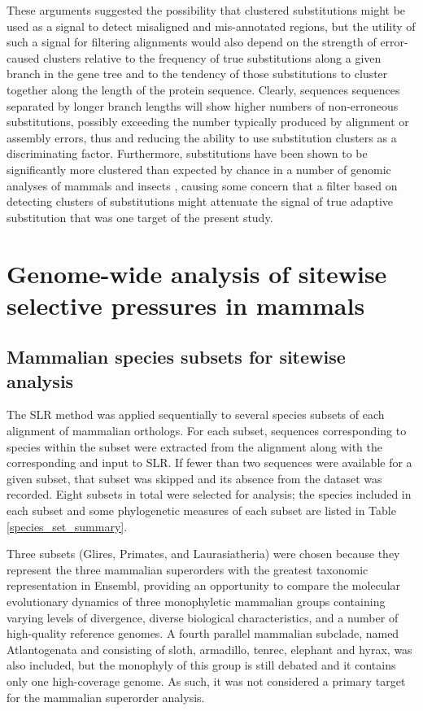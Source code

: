 These arguments suggested the possibility that clustered \nsyn
substitutions might be used as a signal to detect misaligned and
mis-annotated regions, but the utility of such a signal for filtering
alignments would also depend on the strength of error-caused \nsyn
clusters relative to the frequency of true \nsyn substitutions along a
given branch in the gene tree and to the tendency of those
substitutions to cluster together along the length of the protein
sequence. Clearly, sequences sequences separated by longer branch
lengths will show higher numbers of non-erroneous \nsyn substitutions,
possibly exceeding the number typically produced by alignment or
assembly errors, thus and reducing the ability to use substitution
clusters as a discriminating factor. Furthermore, \nsyn substitutions
have been shown to be significantly more clustered than expected by
chance in a number of genomic analyses of mammals and insects
\citep{Callahan2011,Bazykin2004,Wang2007}, causing some concern that a
filter based on detecting clusters of \nsyn substitutions might
attenuate the signal of true adaptive substitution that was one target
of the present study.




\section{Genome-wide analysis of sitewise selective pressures in mammals}

\subsection{Mammalian species subsets for sitewise analysis}

The SLR method was applied sequentially to several species subsets of
each alignment of mammalian orthologs. For each subset, sequences
corresponding to species within the subset were extracted from the
alignment along with the corresponding \subtr and input to SLR. If
fewer than two sequences were available for a given subset, that
subset was skipped and its absence from the dataset was
recorded. Eight subsets in total were selected for analysis; the
species included in each subset and some phylogenetic measures of each
subset are listed in Table \ref{species_set_summary}.

Three subsets (Glires, Primates, and Laurasiatheria) were chosen
because they represent the three mammalian superorders with the
greatest taxonomic representation in Ensembl, providing an opportunity
to compare the molecular evolutionary dynamics of three monophyletic
mammalian groups containing varying levels of divergence, diverse
biological characteristics, and a number of high-quality reference
genomes. A fourth parallel mammalian subclade, named Atlantogenata and
consisting of sloth, armadillo, tenrec, elephant and hyrax, was also
included, but the monophyly of this group is still debated
\citep{Murphy2007,Churakov2009} and it contains only one high-coverage
genome. As such, it was not considered a primary target for the
mammalian superorder analysis.

